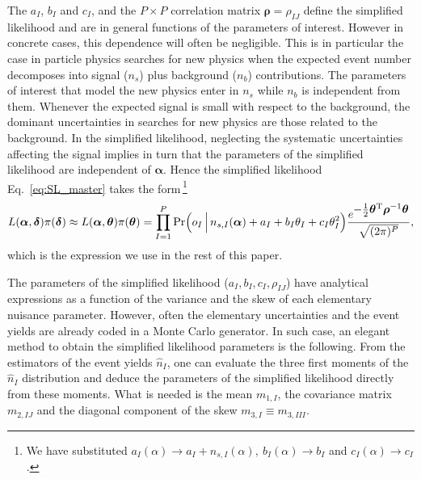 \documentclass[11pt]{article}
\newcommand{\be}{\begin{equation}}
\newcommand{\ee}{\end{equation}}
\begin{document}
The $a_I$, $b_I$ and $c_I$, and the $P\times P$ correlation matrix $\bm{\rho}=\rho_{IJ}$ define the simplified likelihood and are in general functions of the parameters of interest. However in concrete cases, this dependence will often be negligible. This is in particular the case in particle physics searches for new physics when the expected event number decomposes into signal ($n_s$) plus background ($n_b$) contributions. The parameters of interest that model the new physics enter in $n_s$ while $n_b$ is independent from them.  Whenever the expected signal is small with respect to the background, the dominant uncertainties in searches for new physics are those related to the background.
In the simplified likelihood, neglecting the systematic uncertainties affecting the signal implies in turn that the parameters of the simplified likelihood are independent of $\bm \alpha$. Hence the simplified likelihood Eq.~\eqref{eq:SL_master} takes the form\,\footnote{We have substituted
$a_I(\alpha)\rightarrow a_I+n_{s,I}(\alpha),~b_I(\alpha)\rightarrow b_I$ and $c_I(\alpha)\rightarrow c_I$.}
\be
L(\bm{\alpha},\bm{\delta} )\pi(\bm{\delta})  \approx L(\bm{\alpha},\bm{\theta} )\pi(\bm{\theta}) = \prod_{I=1}^P{\rm Pr}\Big(o_I\,\Big|\,n_{s,I}(\bm \alpha)+a_I+ b_I\theta_I+c_I\theta_I^2  \Big)
\frac{ e^{{\textstyle-\frac{1}{2}\bm \theta^{\rm T} \bm{\rho}^{-1} \bm \theta}}}{\sqrt{(2\pi)^P }},
\label{eq:SL_LHC}
\ee
which is the expression we use in the rest of this paper.

The parameters of the simplified likelihood ($a_I, b_I, c_I, \rho_{IJ}$) have analytical expressions
as a function of the variance and the skew  of each elementary nuisance parameter. However, often the elementary uncertainties and the event yields are already coded in a Monte Carlo generator. In such case, %
an elegant method to obtain the simplified likelihood parameters  is the following. From the estimators of the event yields $\hat n_I$, one can evaluate the three first moments of the $\hat n_I$ distribution and deduce the parameters of the simplified likelihood directly from these moments.
What is needed is the mean $m_{1,I}$, the covariance matrix $m_{2,IJ}$ and the diagonal component of the skew $m_{3,I} \equiv m_{3,III}$. %
\end{document}
